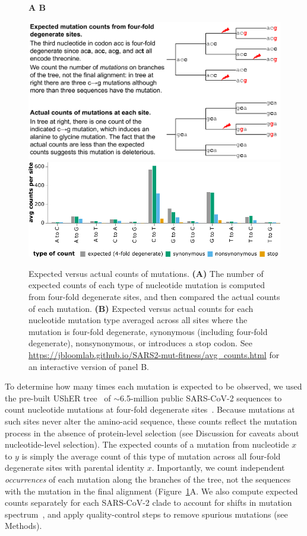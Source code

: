 \documentclass[9pt,twocolumn,twoside]{gsajnl_modified}
\begin{document}
\begin{figure}
{\bf \Large A \hspace{0.47\linewidth} B}

\includegraphics[width=0.48\linewidth,valign=t]{figs/schematic/schematic.pdf}
\hspace{0.02\linewidth}
\includegraphics[width=0.5\linewidth,valign=t]{figs/avg_counts.pdf}
\caption{
Expected versus actual counts of mutations.
{\bf (A)}
The number of expected counts of each type of nucleotide mutation is computed from four-fold degenerate sites, and then compared the actual counts of each mutation.
{\bf (B)}
Expected versus actual counts for each nucleotide mutation type averaged across all sites where the mutation is four-fold degenerate, synonymous (including four-fold degenerate), nonsynonymous, or introduces a stop codon.
See \url{https://jbloomlab.github.io/SARS2-mut-fitness/avg_counts.html} for an interactive version of panel B.
\label{fig:expected_vs_actual}
}
\end{figure}

To determine how many times each mutation is expected to be observed, we used the pre-built UShER tree~\citep{turakhia2021ultrafast,lanfear2020} of $\sim$6.5-million public SARS-CoV-2 sequences to count nucleotide mutations at four-fold degenerate sites~\citep[Figure~\ref{fig:expected_vs_actual}A;][]{bloom2022evolution}.
Because mutations at such sites never alter the amino-acid sequence, these counts reflect the mutation process in the absence of protein-level selection (see Discussion for caveats about nucleotide-level selection).
The expected counts of a mutation from nucleotide $x$ to $y$ is simply the average count of this type of mutation across all four-fold degenerate sites with parental identity $x$.
Importantly, we count independent \emph{occurrences} of each mutation along the branches of the tree, not the sequences with the mutation in the final alignment (Figure~\ref{fig:expected_vs_actual}A.
We also compute expected counts separately for each SARS-CoV-2 clade to account for shifts in mutation spectrum~\citep{bloom2022evolution,ruis2022mutational}, and apply quality-control steps to remove spurious mutations (see Methods).
\end{document}
